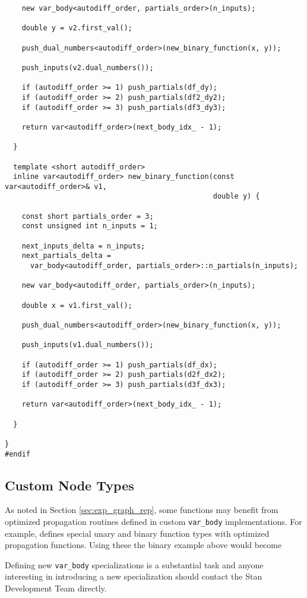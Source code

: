 \begin{verbatim}
    new var_body<autodiff_order, partials_order>(n_inputs);
    
    double y = v2.first_val();
    
    push_dual_numbers<autodiff_order>(new_binary_function(x, y));
    
    push_inputs(v2.dual_numbers());
    
    if (autodiff_order >= 1) push_partials(df_dy);
    if (autodiff_order >= 2) push_partials(df2_dy2);
    if (autodiff_order >= 3) push_partials(df3_dy3);
    
    return var<autodiff_order>(next_body_idx_ - 1);
    
  }
  
  template <short autodiff_order>
  inline var<autodiff_order> new_binary_function(const var<autodiff_order>& v1,
                                                 double y) {
    
    const short partials_order = 3;
    const unsigned int n_inputs = 1;
    
    next_inputs_delta = n_inputs;
    next_partials_delta =
      var_body<autodiff_order, partials_order>::n_partials(n_inputs);
    
    new var_body<autodiff_order, partials_order>(n_inputs);
    
    double x = v1.first_val();
    
    push_dual_numbers<autodiff_order>(new_binary_function(x, y));
    
    push_inputs(v1.dual_numbers());
    
    if (autodiff_order >= 1) push_partials(df_dx);
    if (autodiff_order >= 2) push_partials(d2f_dx2);
    if (autodiff_order >= 3) push_partials(d3f_dx3);
    
    return var<autodiff_order>(next_body_idx_ - 1);
    
  }

}
#endif
\end{verbatim}

\subsection{Custom Node Types}

As noted in Section \ref{sec:exp_graph_rep}, some functions may benefit
from optimized propagation routines defined in custom \verb|var_body|
implementations.  For example, \nomad defines special unary and binary
function types with optimized propagation functions.  Using these the binary
example above would become

Defining new \verb|var_body| specializations is a substantial task and anyone
interesting in introducing a new specialization should contact the Stan Development
Team directly.